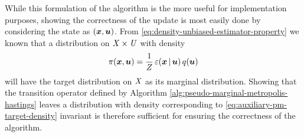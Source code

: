 While this formulation of the algorithm is the more useful for implementation purposes, showing the correctness of the update is most easily done by considering the state as $(\boldsymbol{x},\boldsymbol{u})$. From \eqref{eq:density-unbiased-estimator-property} we known that a distribution on $\mathit{X}\times\mathit{U}$ with density
\begin{equation}\label{eq:auxiliary-pm-target-density}
  \pi(\boldsymbol{x},\boldsymbol{u}) = \frac{1}{Z} \,\varepsilon(\boldsymbol{x}\operatorname{|}\boldsymbol{u})\,q(\boldsymbol{u})
\end{equation}
will have the target distribution on $\mathit{X}$ as its marginal distribution. Showing that the transition operator defined by Algorithm \ref{alg:pseudo-marginal-metropolis-hastings} leaves a distribution with density corresponding to \eqref{eq:auxiliary-pm-target-density} invariant is therefore sufficient for ensuring the correctness of the algorithm.

